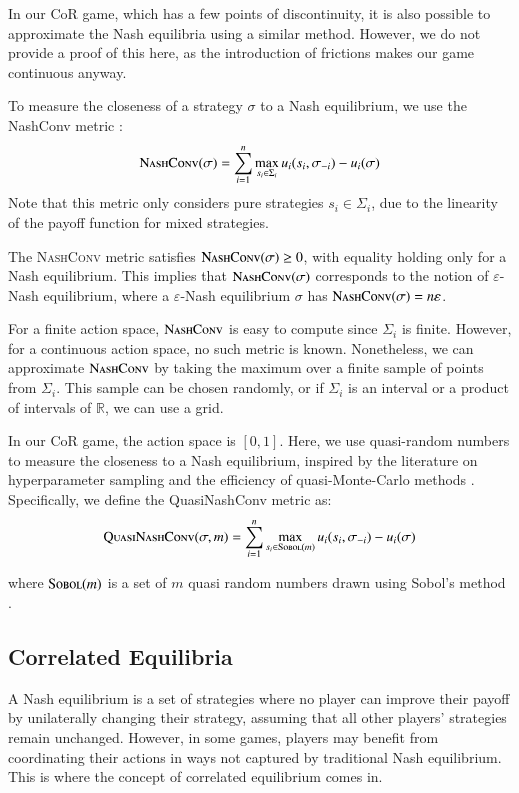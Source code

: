 \documentclass[preprint,12pt,authoryear,doubleblind]{elsarticle}
\theoremstyle{definition}
\begin{document}
In our CoR game, which has a few points of discontinuity, it is also possible to approximate the Nash equilibria using a similar method. However, we do not provide a proof of this here, as the introduction of frictions makes our game continuous anyway. 

To measure the closeness of a strategy $\sigma$ to a Nash equilibrium, we use the NashConv metric \citep{Lanctot2017-wc}: 
$$\textsc{NashConv}(\sigma) = \sum_{i=1}^n \max_{s_i \in \Sigma_i} u_i(s_i, \sigma_{-i}) - u_i(\sigma)$$
Note that this metric only considers pure strategies $s_i \in \Sigma_i$, due to the linearity of the payoff function for mixed strategies. 

The \textsc{NashConv} metric satisfies $\textsc{NashConv}(\sigma) \ge 0$, with equality holding only for a Nash equilibrium. This implies that $\textsc{NashConv}(\sigma)$ corresponds to the notion of $\varepsilon$-Nash equilibrium, where a $\varepsilon$-Nash equilibrium $\sigma$ has $\textsc{NashConv}(\sigma) = n \varepsilon$. 

For a finite action space, $\textsc{NashConv}$ is easy to compute since $\Sigma_i$ is finite. However, for a continuous action space, no such metric is known. Nonetheless, we can approximate $\textsc{NashConv}$ by taking the maximum over a finite sample of points from $\Sigma_i$. This sample can be chosen randomly, or if $\Sigma_i$ is an interval or a product of intervals of $\mathbb{R}$, we can use a grid. 

In our CoR game, the action space is $[0,1]$. Here, we use quasi-random numbers to measure the closeness to a Nash equilibrium, inspired by the literature on hyperparameter sampling \citep{Bousquet2017-kg} and the efficiency of quasi-Monte-Carlo methods \citep{sobol1990quasi}. Specifically, we define the QuasiNashConv metric as: 
$$\textsc{QuasiNashConv}(\sigma, m) = \sum_{i=1}^n \max_{s_i \in \textsc{Sobol}(m)} u_i(s_i, \sigma_{-i}) - u_i(\sigma)$$

where $\textsc{Sobol}(m)$ is a set of $m$ quasi random numbers drawn using Sobol’s method \citep{sobol1967distribution}.

\subsection{Correlated Equilibria}

A Nash equilibrium is a set of strategies where no player can improve their payoff by unilaterally changing their strategy, assuming that all other players' strategies remain unchanged. However, in some games, players may benefit from coordinating their actions in ways not captured by traditional Nash equilibrium. This is where the concept of correlated equilibrium comes in.
\end{document}
